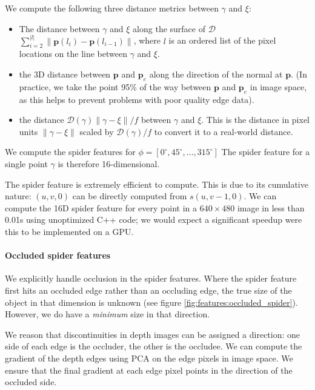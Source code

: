 \documentclass[10pt,twocolumn,letterpaper]{article}
\newcommand{\degree}{^{\circ}}
\newcommand{\rgbdimage}{\mathcal{D}}
\newcommand{\pixelidx}{\gamma}
\newcommand{\edgeimidx}{\xi}
\newcommand{\project}{\mathbf{p}}
\newcommand{\point}{\mathbf{p}}
\begin{document}
We compute the following three distance metrics between $\pixelidx$ and $\edgeimidx$:
\begin{itemize}
\item The distance between $\pixelidx$ and $\edgeimidx$ along the surface of $\rgbdimage$
$\sum_{i=2}^{|l|} \| \project(l_i) - \project(l_{i-1}) \| $, where $l$ is an ordered list of the pixel locations on the line between $\pixelidx$ and $\edgeimidx$.

\item the 3D distance between $\point$ and $\point_{e}$ along the direction of the normal at $\point$. (In practice, we take the point 95\% of the way between $\point$ and $\point_{e}$ in image space, as this helps to prevent problems with poor quality edge data).

\item the distance $\rgbdimage(\pixelidx) \|\pixelidx - \edgeimidx\| / f$ between $\pixelidx$ and $\edgeimidx$. This is the distance in pixel units $\|\pixelidx - \edgeimidx\|$ scaled by $\rgbdimage(\pixelidx) / f$ to convert it to a real-world distance.
\end{itemize}

We compute the spider features for  $\phi = [0\degree, 45\degree, \ldots, 315\degree]$
The spider feature for a single point $\pixelidx$ is therefore 16-dimensional.

The spider feature is extremely efficient to compute.
This is due to its cumulative nature: $(u, v, 0)$ can be directly computed from $s(u, v-1, 0)$.
We can compute the 16D spider feature for every point in a $640\times480$ image in less than 0.01s using unoptimized C++ code; we would expect a significant speedup were this to be implemented on a GPU.


\paragraph{Occluded spider features}

We explicitly handle occlusion in the spider features. Where the spider feature first hits an occluded edge rather than an occluding edge, the true size of the object in that dimension is unknown (see figure \ref{fig:features:occluded_spider}).
However, we do have a \textit{minimum} size in that direction.

We reason that discontinuities in depth images can be assigned a direction: one side of each edge is the occluder, the other is the occludee. 
We can compute the gradient of the depth edges using PCA on the edge pixels in image space.
We ensure that the final gradient at each edge pixel points in the direction of the occluded side.
\end{document}
